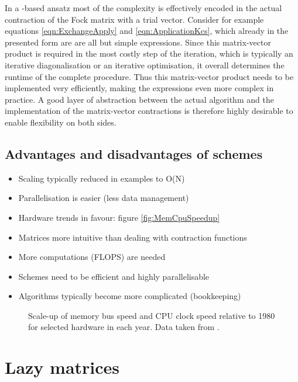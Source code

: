 In a \contraction-based ansatz most of the complexity is effectively
encoded in the actual contraction of the Fock matrix with a trial vector.
Consider for example equations \eqref{eqn:ExchangeApply}
and \eqref{eqn:ApplicationKcs},
which already in the presented form are are all but simple expressions.
Since this matrix-vector product is required in the most costly step
of the \SCF iteration,
which is typically an iterative diagonalisation or an iterative optimisation,
it overall determines the runtime of the complete procedure.
Thus this matrix-vector product needs to be implemented very efficiently,
making the expressions even more complex in practice.
A good layer of abstraction between the actual \SCF algorithm
and the implementation of the matrix-vector contractions
is therefore highly desirable to enable flexibility on both sides.



\subsection{Advantages and disadvantages of \contraction schemes}
\begin{itemize}
	\item Scaling typically reduced in examples to O(N)
	\item Parallelisation is easier (less data management)
	\item Hardware trends in favour: figure \vref{fig:MemCpuSpeedup}
	\item Matrices more intuitive than dealing with contraction functions
	\item More computations (FLOPS) are needed
	\item Schemes need to be efficient and highly parallelisable
	\item Algorithms typically become more complicated (bookkeeping)
\end{itemize}


\begin{figure}
	\centering
	\caption[Scale-up of memory bus speed and CPU clock speed]
	{Scale-up of memory bus speed and CPU clock speed
		relative to 1980 for selected hardware in each year.
		Data taken from \cite{Gocon2014}.}
	\label{fig:MemCpuSpeedup}
\end{figure}


\section{Lazy matrices}

